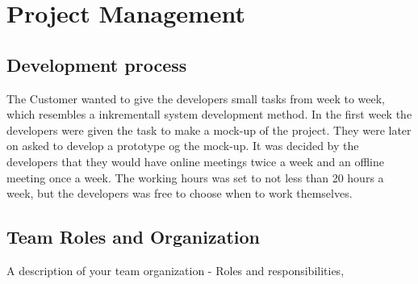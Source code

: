 \chapter{Project Management}
\section{Development process}
The Customer wanted to give the developers small tasks from week to week, which resembles a inkrementall system development method.
In the first week the developers were given the task to make a mock-up of the project. They were later on asked to develop a prototype og the mock-up.
It was decided by the developers that they would have online meetings twice a week and an offline meeting once a week. 
The working hours was set to not less than 20 hours a week, but the developers was free to choose when to work themselves.
\section{Team Roles and Organization}
A description of your team organization - Roles and responsibilities,
 
